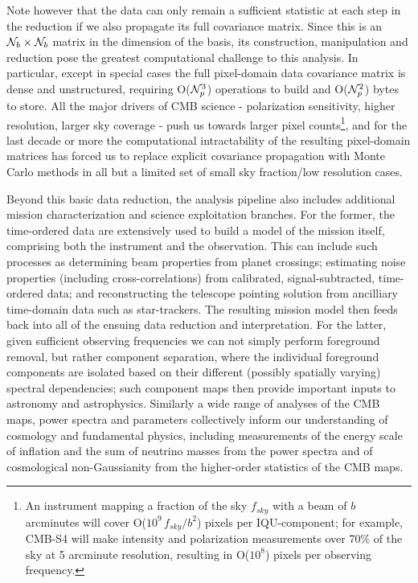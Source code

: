 Note however that the data can only remain a sufficient statistic at each step in the reduction if we also propagate its full covariance matrix. Since this is an ${\cal N}_b \times {\cal N}_b$ matrix in the dimension of the basis, its construction, manipulation and reduction pose the greatest computational challenge to this analysis. In particular, except in special cases the full pixel-domain data covariance matrix is dense and unstructured, requiring O(${\cal N}_p^3$) operations to build and O(${\cal N}_p^2$) bytes to store. All the major drivers of CMB science - polarization sensitivity, higher resolution, larger sky coverage - push us towards larger pixel counts\footnote{An instrument mapping a fraction of the sky $f_{sky}$ with a beam of $b$ arcminutes will cover O($10^9 \, f_{sky}/b^2$) pixels per IQU-component; for example, CMB-S4 will make intensity and polarization measurements over 70\% of the sky at 5 arcminute resolution, resulting in O($10^8$) pixels per observing frequency.}, and for the last decade or more the computational intractability of the resulting pixel-domain matrices has forced us to replace explicit covariance propagation with Monte Carlo methods in all but a limited set of small sky fraction/low resolution cases.

Beyond this basic data reduction, the analysis pipeline also includes additional mission characterization and science exploitation branches. For the former, the time-ordered data are extensively used to build a model of the mission itself, comprising both the instrument and the observation. This can include such processes as determining beam properties from planet crossings; estimating noise properties (including cross-correlations) from calibrated, signal-subtracted, time-ordered data; and reconstructing the telescope pointing solution from ancilliary time-domain data such as star-trackers. The resulting mission model then feeds back into all of the ensuing data reduction and interpretation. For the latter, given sufficient observing frequencies we can not simply perform foreground removal, but rather component separation, where the individual foreground components are isolated based on their different (possibly spatially varying) spectral dependencies; such component maps then provide important inputs to astronomy and astrophysics. Similarly a wide range of analyses of the CMB maps, power spectra and parameters collectively inform our understanding of cosmology and fundamental physics, including measurements of the energy scale of inflation and the sum of neutrino masses from the power spectra and of cosmological non-Gaussianity from the higher-order statistics of the CMB maps.

